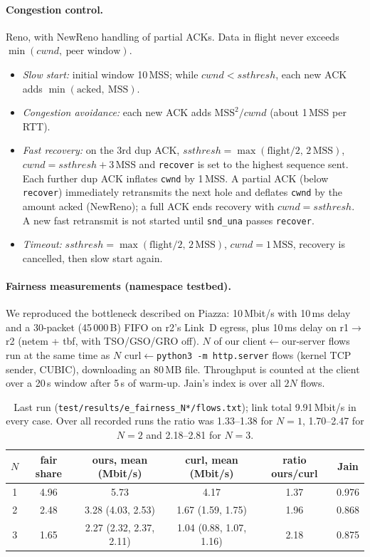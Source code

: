 \documentclass[10pt,a4paper]{article}
\newcommand{\cmd}[1]{\texttt{#1}}
\begin{document}
\paragraph{Congestion control.} Reno, with NewReno handling of partial ACKs.
Data in flight never exceeds $\min(\mathit{cwnd},\ \mbox{peer window})$.
\begin{itemize}\setlength\itemsep{0pt}
\item \emph{Slow start:} initial window 10\,MSS; while $\mathit{cwnd}<\mathit{ssthresh}$,
  each new ACK adds $\min(\mbox{acked},\ \mathrm{MSS})$.
\item \emph{Congestion avoidance:} each new ACK adds $\mathrm{MSS}^2/\mathit{cwnd}$
  (about 1\,MSS per RTT).
\item \emph{Fast recovery:} on the 3rd dup ACK, $\mathit{ssthresh}=\max(\mbox{flight}/2,\,2\,\mathrm{MSS})$,
  $\mathit{cwnd}=\mathit{ssthresh}+3\,\mathrm{MSS}$ and \cmd{recover} is set to the highest sequence sent.
  Each further dup ACK inflates \cmd{cwnd} by 1\,MSS. A partial ACK (below \cmd{recover})
  immediately retransmits the next hole and deflates \cmd{cwnd} by the amount acked (NewReno);
  a full ACK ends recovery with $\mathit{cwnd}=\mathit{ssthresh}$. A new fast retransmit is
  not started until \cmd{snd\_una} passes \cmd{recover}.
\item \emph{Timeout:} $\mathit{ssthresh}=\max(\mbox{flight}/2,\,2\,\mathrm{MSS})$,
  $\mathit{cwnd}=1\,\mathrm{MSS}$, recovery is cancelled, then slow start again.
\end{itemize}

\paragraph{Fairness measurements (namespace testbed).}
We reproduced the bottleneck described on Piazza: 10\,Mbit/s with 10\,ms delay and a
30-packet (45\,000\,B) FIFO on r2's Link~D egress, plus 10\,ms delay on r1$\to$r2 (netem +
tbf, with TSO/GSO/GRO off). $N$ of our client$\leftarrow$our-server flows run at the same time as $N$
curl$\leftarrow$\cmd{python3 -m http.server} flows (kernel TCP sender, CUBIC), downloading
an 80\,MB file. Throughput is counted at the client over a 20\,s window after 5\,s of warm-up.
Jain's index is over all $2N$ flows.

\begin{table}[H]\centering\small
\begin{tabular}{@{}cccccc@{}}
\toprule
$N$ & fair share & ours, mean (Mbit/s) & curl, mean (Mbit/s) & ratio ours/curl & Jain\\
\midrule
1 & 4.96 & 5.73 & 4.17 & 1.37 & 0.976\\
2 & 2.48 & 3.28 (4.03, 2.53) & 1.67 (1.59, 1.75) & 1.96 & 0.868\\
3 & 1.65 & 2.27 (2.32, 2.37, 2.11) & 1.04 (0.88, 1.07, 1.16) & 2.18 & 0.875\\
\bottomrule
\end{tabular}
\caption{Last run (\cmd{test/results/e\_fairness\_N*/flows.txt}); link total 9.91\,Mbit/s in every case.
Over all recorded runs the ratio was 1.33--1.38 for $N{=}1$, 1.70--2.47 for $N{=}2$
and 2.18--2.81 for $N{=}3$.}
\end{table}
\end{document}
